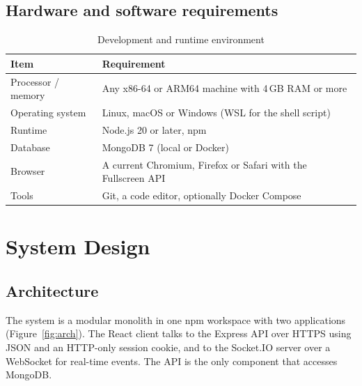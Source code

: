 \documentclass[12pt,a4paper,oneside]{report}
\newcommand{\code}[1]{\texttt{\detokenize{#1}}}
\begin{document}
\section{Hardware and software requirements}
\begin{table}[htbp]\centering
\caption{Development and runtime environment}\label{tab:env}
\begin{tabularx}{\linewidth}{@{}lX@{}}
\toprule
\textbf{Item} & \textbf{Requirement}\\ \midrule
Processor / memory & Any x86-64 or ARM64 machine with 4\,GB RAM or more\\
Operating system & Linux, macOS or Windows (WSL for the shell script)\\
Runtime & Node.js 20 or later, npm\\
Database & MongoDB 7 (local \code{mongod} or Docker)\\
Browser & A current Chromium, Firefox or Safari with the Fullscreen API\\
Tools & Git, a code editor, optionally Docker Compose\\
\bottomrule
\end{tabularx}
\end{table}

\chapter{System Design}
\label{ch:design}

\section{Architecture}
The system is a modular monolith in one npm workspace with two applications (Figure~\ref{fig:arch}). The React client
talks to the Express API over HTTPS using JSON and an HTTP-only session cookie, and to the Socket.IO server over a
WebSocket for real-time events. The API is the only component that accesses MongoDB.
\end{document}
